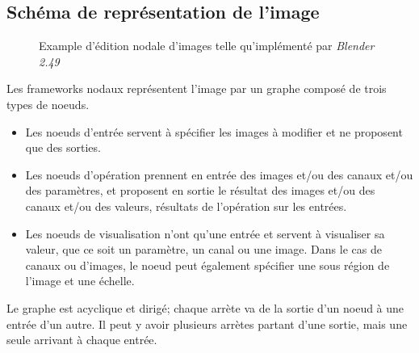 		\subsection{Schéma de représentation de l'image}
			\begin{figure}[h]
				\centering
				\caption{Example d'édition nodale d'images telle qu'implémenté par \emph{Blender 2.49}}
				\label{fig:editnodal}
			\end{figure}
			Les frameworks nodaux représentent l'image par un graphe composé de trois types de noeuds.
			\begin{itemize}
				\item Les noeuds d'entrée servent à spécifier les images à modifier et ne proposent que des sorties.
				\item Les noeuds d'opération prennent en entrée des images et/ou des canaux et/ou des paramètres,
				et proposent en sortie le résultat des images et/ou des canaux et/ou des valeurs, résultats de
				l'opération sur les entrées.
				\item Les noeuds de visualisation n'ont qu'une entrée et servent à visualiser sa valeur, que ce soit un paramètre,
				un canal ou une image. Dans le cas de canaux ou d'images, le noeud peut également spécifier une sous région
				de l'image et une échelle.
			\end{itemize}
			Le graphe est acyclique et dirigé; chaque arrète va de la sortie d'un noeud à une entrée d'un autre. Il peut
			y avoir plusieurs arrètes partant d'une sortie, mais une seule arrivant à chaque entrée. 
		
